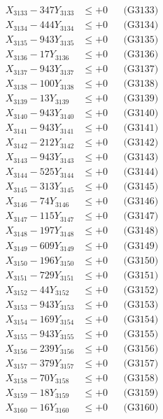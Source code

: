 \documentclass[a4paper,10pt]{article}
\begin{document}
{\begin{align}
X_{3133} - 347Y_{3133} &\leq +0 && \text{(G3133)} \\
X_{3134} - 444Y_{3134} &\leq +0 && \text{(G3134)} \\
X_{3135} - 943Y_{3135} &\leq +0 && \text{(G3135)} \\
X_{3136} - 17Y_{3136} &\leq +0 && \text{(G3136)} \\
X_{3137} - 943Y_{3137} &\leq +0 && \text{(G3137)} \\
X_{3138} - 100Y_{3138} &\leq +0 && \text{(G3138)} \\
X_{3139} - 13Y_{3139} &\leq +0 && \text{(G3139)} \\
X_{3140} - 943Y_{3140} &\leq +0 && \text{(G3140)} \\
\allowbreak
X_{3141} - 943Y_{3141} &\leq +0 && \text{(G3141)} \\
X_{3142} - 212Y_{3142} &\leq +0 && \text{(G3142)} \\
X_{3143} - 943Y_{3143} &\leq +0 && \text{(G3143)} \\
X_{3144} - 525Y_{3144} &\leq +0 && \text{(G3144)} \\
X_{3145} - 313Y_{3145} &\leq +0 && \text{(G3145)} \\
X_{3146} - 74Y_{3146} &\leq +0 && \text{(G3146)} \\
X_{3147} - 115Y_{3147} &\leq +0 && \text{(G3147)} \\
X_{3148} - 197Y_{3148} &\leq +0 && \text{(G3148)} \\
X_{3149} - 609Y_{3149} &\leq +0 && \text{(G3149)} \\
X_{3150} - 196Y_{3150} &\leq +0 && \text{(G3150)} \\
\allowbreak
X_{3151} - 729Y_{3151} &\leq +0 && \text{(G3151)} \\
X_{3152} - 44Y_{3152} &\leq +0 && \text{(G3152)} \\
X_{3153} - 943Y_{3153} &\leq +0 && \text{(G3153)} \\
X_{3154} - 169Y_{3154} &\leq +0 && \text{(G3154)} \\
X_{3155} - 943Y_{3155} &\leq +0 && \text{(G3155)} \\
X_{3156} - 239Y_{3156} &\leq +0 && \text{(G3156)} \\
X_{3157} - 379Y_{3157} &\leq +0 && \text{(G3157)} \\
X_{3158} - 70Y_{3158} &\leq +0 && \text{(G3158)} \\
X_{3159} - 18Y_{3159} &\leq +0 && \text{(G3159)} \\
X_{3160} - 16Y_{3160} &\leq +0 && \text{(G3160)} \\

\end{align}}
\end{document}
